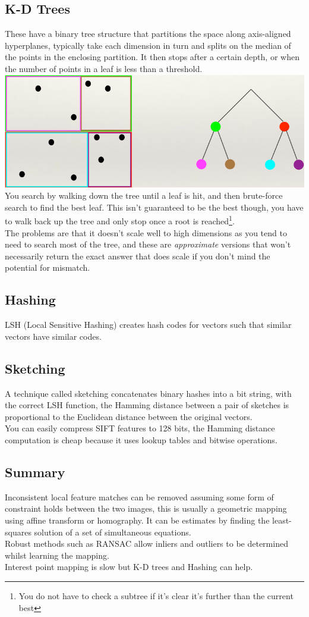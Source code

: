\documentclass{article}
\begin{document}
	\subsection{K-D Trees}
	These have a binary tree structure that partitions the space along axis-aligned hyperplanes, typically take each dimension in turn and splits on the median of the points in the enclosing partition. It then stops after a certain depth, or when the number of points in a leaf is less than a threshold.\\
	\includegraphics[width=\linewidth]{kd}
	You search by walking down the tree until a leaf is hit, and then brute-force search to find the best leaf. This isn't guaranteed to be the best though, you have to walk back up the tree and only stop once a root is reached\footnote{You do not have to check a subtree if it's clear it's further than the current best}.\\
	The problems are that it doesn't scale well to high dimensions as you tend to need to search most of the tree, and these are \textit{approximate} versions that won't necessarily return the exact answer that does scale if you don't mind the potential for mismatch.
	\subsection{Hashing}
	LSH (Local Sensitive Hashing) creates hash codes for vectors such that similar vectors have similar codes.
	\subsection{Sketching}
	A technique called sketching concatenates binary hashes into a bit string, with the correct LSH function, the Hamming distance between a pair of sketches is proportional to the Euclidean distance between the original vectors.\\
	You can easily compress SIFT features to 128 bits, the Hamming distance computation is cheap because it uses lookup tables and bitwise operations.
	\subsection{Summary}
	Inconsistent local feature matches can be removed assuming some form of constraint holds between the two images, this is usually a geometric mapping using affine transform or homography. It can be estimates by finding the least-squares solution of a set of simultaneous equations.\\
	Robust methods such as RANSAC allow inliers and outliers to be determined whilst learning the mapping.\\
	Interest point mapping is slow but K-D trees and Hashing can help.
	
\end{document}
